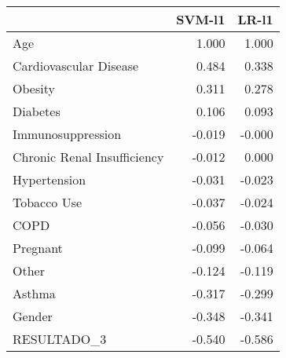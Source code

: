 \begin{tabular}{lrr}
\toprule
{} &  SVM-l1 &  LR-l1 \\
\midrule
Age                         &   1.000 &  1.000 \\
Cardiovascular Disease      &   0.484 &  0.338 \\
Obesity                     &   0.311 &  0.278 \\
Diabetes                    &   0.106 &  0.093 \\
Immunosuppression           &  -0.019 & -0.000 \\
Chronic Renal Insufficiency &  -0.012 &  0.000 \\
Hypertension                &  -0.031 & -0.023 \\
Tobacco Use                 &  -0.037 & -0.024 \\
COPD                        &  -0.056 & -0.030 \\
Pregnant                    &  -0.099 & -0.064 \\
Other                       &  -0.124 & -0.119 \\
Asthma                      &  -0.317 & -0.299 \\
Gender                      &  -0.348 & -0.341 \\
RESULTADO\_3                 &  -0.540 & -0.586 \\
\bottomrule
\end{tabular}
